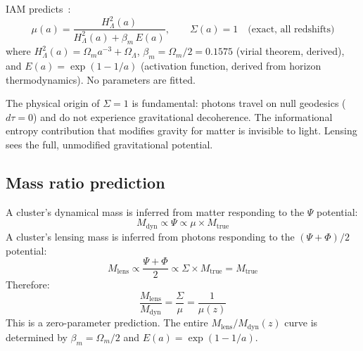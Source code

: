 \documentclass[12pt,a4paper]{article}
\begin{document}
IAM predicts~\citep{Mahaffey2026a,Mahaffey2026b}:
\begin{equation}
\mu(a) = \frac{H^2_\Lambda(a)}{H^2_\Lambda(a) + \beta_m\, E(a)}, \qquad
\Sigma(a) = 1 \quad \text{(exact, all redshifts)}
\label{eq:mu}
\end{equation}
where $H^2_\Lambda(a) = \Omega_m a^{-3} + \Omega_\Lambda$,
$\beta_m = \Omega_m/2 = 0.1575$ (virial theorem, derived),
and $E(a) = \exp(1-1/a)$ (activation function, derived from horizon
thermodynamics). No parameters are fitted.

The physical origin of $\Sigma = 1$ is fundamental: photons travel on null
geodesics ($d\tau = 0$) and do not experience gravitational decoherence. The
informational entropy contribution that modifies gravity for matter is invisible
to light. Lensing sees the full, unmodified gravitational potential.

\subsection{Mass ratio prediction}

A cluster's dynamical mass is inferred from matter responding to the $\Psi$
potential:
\begin{equation}
M_\mathrm{dyn} \propto \Psi \propto \mu \times M_\mathrm{true}
\end{equation}
A cluster's lensing mass is inferred from photons responding to the
$(\Psi + \Phi)/2$ potential:
\begin{equation}
M_\mathrm{lens} \propto \frac{\Psi+\Phi}{2} \propto \Sigma \times M_\mathrm{true}
= M_\mathrm{true}
\end{equation}
Therefore:
\begin{equation}
\boxed{\frac{M_\mathrm{lens}}{M_\mathrm{dyn}} = \frac{\Sigma}{\mu} = \frac{1}{\mu(z)}}
\label{eq:ratio}
\end{equation}
This is a zero-parameter prediction. The entire $M_\mathrm{lens}/M_\mathrm{dyn}(z)$
curve is determined by $\beta_m = \Omega_m/2$ and $E(a) = \exp(1-1/a)$.
\end{document}
